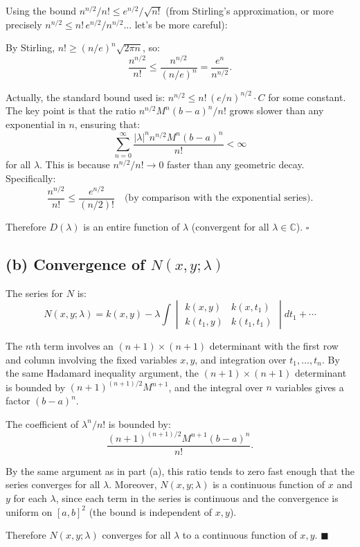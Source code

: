 \documentclass[12pt]{article}
\begin{document}
Using the bound $n^{n/2}/n! \le e^{n/2}/\sqrt{n!}$ (from Stirling's approximation, or more precisely $n^{n/2} \le n!\,e^{n/2}/n^{n/2}$... let's be more careful):

By Stirling, $n! \ge (n/e)^n\sqrt{2\pi n}$, so:
\[
\frac{n^{n/2}}{n!} \le \frac{n^{n/2}}{(n/e)^n} = \frac{e^n}{n^{n/2}}.
\]

Actually, the standard bound used is: $n^{n/2} \le n!\,(e/n)^{n/2} \cdot C$ for some constant. The key point is that the ratio $n^{n/2}M^n(b-a)^n/n!$ grows slower than any exponential in $n$, ensuring that:
\[
\sum_{n=0}^{\infty} \frac{|\lambda|^n n^{n/2}M^n(b-a)^n}{n!} < \infty
\]
for all $\lambda$. This is because $n^{n/2}/n! \to 0$ faster than any geometric decay. Specifically:
\[
\frac{n^{n/2}}{n!} \le \frac{e^{n/2}}{(n/2)!} \quad \text{(by comparison with the exponential series)}.
\]

Therefore $D(\lambda)$ is an entire function of $\lambda$ (convergent for all $\lambda \in \mathbb{C}$). \hfill $\square$

\subsection*{(b) Convergence of $N(x,y;\lambda)$}

The series for $N$ is:
\[
N(x,y;\lambda) = k(x,y) - \lambda \int \begin{vmatrix} k(x,y) & k(x,t_1) \\ k(t_1,y) & k(t_1,t_1) \end{vmatrix} dt_1 + \cdots
\]

The $n$th term involves an $(n+1)\times(n+1)$ determinant with the first row and column involving the fixed variables $x,y$, and integration over $t_1, \ldots, t_n$. By the same Hadamard inequality argument, the $(n+1)\times(n+1)$ determinant is bounded by $(n+1)^{(n+1)/2}M^{n+1}$, and the integral over $n$ variables gives a factor $(b-a)^n$.

The coefficient of $\lambda^n/n!$ is bounded by:
\[
\frac{(n+1)^{(n+1)/2}M^{n+1}(b-a)^n}{n!}.
\]

By the same argument as in part (a), this ratio tends to zero fast enough that the series converges for all $\lambda$. Moreover, $N(x,y;\lambda)$ is a continuous function of $x$ and $y$ for each $\lambda$, since each term in the series is continuous and the convergence is uniform on $[a,b]^2$ (the bound is independent of $x,y$).

Therefore $N(x,y;\lambda)$ converges for all $\lambda$ to a continuous function of $x,y$. \hfill $\blacksquare$
\end{document}

